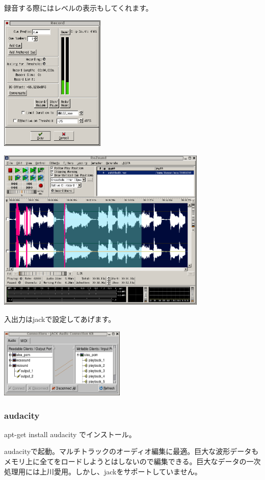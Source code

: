 \documentclass[mingoth,a4paper]{jsarticle}
\begin{document}
録音する際にはレベルの表示もしてくれます。

\includegraphics[width=5cm]{image200602/rezound-4.png}

\includegraphics[width=10cm]{image200602/rezound-5.png}

入出力はjackで設定してあげます。

\includegraphics[width=6cm]{image200602/rezound-6.png}

\subsubsection{audacity}

apt-get install audacity でインストール。

audacityで起動。マルチトラックのオーディオ編集に最適。巨大な波形データも
メモリ上に全てをロードしようとはしないので編集できる。巨大なデータの一次
処理用には上川愛用。しかし、jackをサポートしていません。
\end{document}
